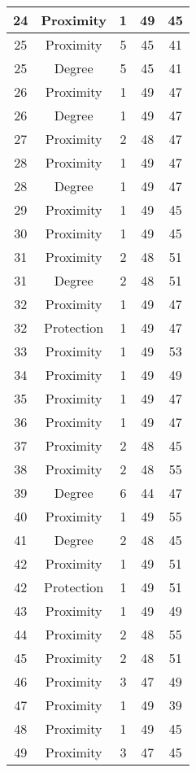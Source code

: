 \documentclass[results.tex]{subfiles}
\begin{document}
\begin{center}
\begin{tabular}{| c || c | c | c | c |}
    \hline
    24 & Proximity & 1 & 49 & 45 \\ 
    \hline
    25 & Proximity & 5 & 45 & 41 \\ 
    \hline
    25 & Degree & 5 & 45 & 41 \\ 
    \hline
    26 & Proximity & 1 & 49 & 47 \\ 
    \hline
    26 & Degree & 1 & 49 & 47 \\ 
    \hline
    27 & Proximity & 2 & 48 & 47 \\ 
    \hline
    28 & Proximity & 1 & 49 & 47 \\ 
    \hline
    28 & Degree & 1 & 49 & 47 \\ 
    \hline
    29 & Proximity & 1 & 49 & 45 \\ 
    \hline
    30 & Proximity & 1 & 49 & 45 \\ 
    \hline
    31 & Proximity & 2 & 48 & 51 \\ 
    \hline
    31 & Degree & 2 & 48 & 51 \\ 
    \hline
    32 & Proximity & 1 & 49 & 47 \\ 
    \hline
    32 & Protection & 1 & 49 & 47 \\ 
    \hline
    33 & Proximity & 1 & 49 & 53 \\ 
    \hline
    34 & Proximity & 1 & 49 & 49 \\ 
    \hline
    35 & Proximity & 1 & 49 & 47 \\ 
    \hline
    36 & Proximity & 1 & 49 & 47 \\ 
    \hline
    37 & Proximity & 2 & 48 & 45 \\ 
    \hline
    38 & Proximity & 2 & 48 & 55 \\ 
    \hline
    39 & Degree & 6 & 44 & 47 \\ 
    \hline
    40 & Proximity & 1 & 49 & 55 \\ 
    \hline
    41 & Degree & 2 & 48 & 45 \\ 
    \hline
    42 & Proximity & 1 & 49 & 51 \\ 
    \hline
    42 & Protection & 1 & 49 & 51 \\ 
    \hline
    43 & Proximity & 1 & 49 & 49 \\ 
    \hline
    44 & Proximity & 2 & 48 & 55 \\ 
    \hline
    45 & Proximity & 2 & 48 & 51 \\ 
    \hline
    46 & Proximity & 3 & 47 & 49 \\ 
    \hline
    47 & Proximity & 1 & 49 & 39 \\ 
    \hline
    48 & Proximity & 1 & 49 & 45 \\ 
    \hline
    49 & Proximity & 3 & 47 & 45 \\ 
    \hline   \end{tabular}
\end{center}
\end{document}

